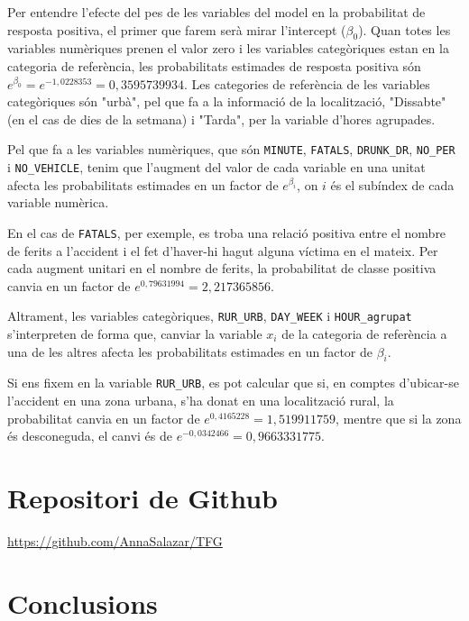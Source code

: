 \documentclass[12pt,longbibliography]{article}
\theoremstyle{definition}
\theoremstyle{remark}
\begin{document}
Per entendre l'efecte del pes de les variables del model en la probabilitat de resposta positiva, el primer que farem serà mirar l'intercept ($\beta_0$). Quan totes les variables numèriques prenen el valor zero i les variables categòriques estan en la categoria de referència, les probabilitats estimades de resposta positiva són $e^{\beta_0} = e^{-1,0228353} = 0,3595739934$. Les categories de referència de les variables categòriques són "urbà", pel que fa a la informació de la localització, "Dissabte" (en el cas de dies de la setmana) i "Tarda", per la variable d'hores agrupades.

Pel que fa a les variables numèriques, que són \texttt{MINUTE}, \texttt{FATALS}, \texttt{DRUNK\_DR}, \texttt{NO\_PER} i \texttt{NO\_VEHICLE}, tenim que l'augment del valor de cada variable en una unitat afecta les probabilitats estimades en un factor de $e^{\beta_i}$, on $i$ és el subíndex de cada variable numèrica.


En el cas de \texttt{FATALS}, per exemple, es troba una relació positiva entre el nombre de ferits a l'accident i el fet d'haver-hi hagut alguna víctima en el mateix. Per cada augment unitari en el nombre de ferits, la probabilitat de classe positiva canvia en un factor de $e^{0,79631994} = 2,217365856$.


Altrament, les variables categòriques, \texttt{RUR\_URB}, \texttt{DAY\_WEEK} i \texttt{HOUR\_agrupat} s'interpreten de forma que, canviar la variable $x_i$ de la categoria de referència a una de les altres afecta les probabilitats estimades en un factor de $\beta_i$.


Si ens fixem en la variable \texttt{RUR\_URB}, es pot calcular que si, en comptes d'ubicar-se l'accident en una zona urbana, s'ha donat en una localització rural, la probabilitat canvia en un factor de $e^{0,4165228} = 1,519911759$, mentre que si la zona és desconeguda, el canvi és de $e^{-0,0342466} = 0,9663331775$.


\newpage

\section{Repositori de Github}

\url{https://github.com/AnnaSalazar/TFG}

\newpage

\section{Conclusions}
\end{document}
